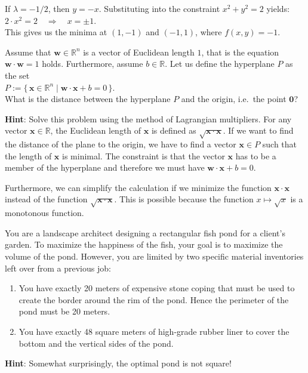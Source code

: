 If $\lambda = -1/2$, then $y = -x$. Substituting into the constraint $x^2 + y^2 = 2$ yields:
\\[0.2cm]
\hspace*{1.3cm}
$2\cdot x^2 = 2 \quad \Rightarrow \quad x = \pm 1$.
\\[0.2cm]
This gives us the minima at $(1,-1)$ and $(-1,1)$, where $f(x,y)=-1$.

\exercise
Assume that $\mathbf{w}\in \mathbb{R}^n$ is a vector of Euclidean length $1$, that is the equation
$\mathbf{w} \cdot \mathbf{w} = 1$ holds.  Furthermore, assume $b \in \mathbb{R}$.  Let us define the hyperplane $P$ as the set
\\[0.2cm]
\hspace*{1.3cm}
$P := \bigl\{\, \mathbf{x} \in \mathbb{R}^n \mid \mathbf{w}\cdot \mathbf{x} + b = 0 \,\bigr\}$.
\\[0.2cm]
What is the distance between the hyperplane $P$ and the origin, i.e.~the point $\mathbf{0}$?
\vspace*{0.1cm}

\noindent
\textbf{Hint}: Solve this problem using the method of Lagrangian multipliers.  For any vector
$\mathbf{x} \in \mathbb{R}$, the Euclidean length of $\mathbf{x}$ is defined as $\sqrt{\mathbf{x} \cdot\mathbf{x}}$.
If we want to find the distance of the plane to the origin, we have to find a vector $\mathbf{x} \in P$
such that the length of $\mathbf{x}$ is minimal.  The constraint is that the vector $\mathbf{x}$
has to be a member of the hyperplane and therefore we must have $\mathbf{w}\cdot\mathbf{x} + b = 0$.

Furthermore, we can simplify the calculation if we minimize the function $\mathbf{x} \cdot\mathbf{x}$
instead of the function $\sqrt{\mathbf{x} \cdot\mathbf{x}}$.  This is possible because the function
$x \mapsto \sqrt{x}$ is a monotonous function.
\eox

\exercise
You are a landscape architect designing a rectangular fish pond for a client's garden.  To maximize the
happiness of the fish, your goal is to maximize the volume of the pond.  However, you are limited by two
specific material inventories left over from a previous job:
\begin{enumerate}
\item You have exactly 20 meters of expensive stone coping that must be used to create the border around the
      rim of the pond.  Hence the perimeter of the pond must be 20 meters.
\item You have exactly 48 square meters of high-grade rubber liner to cover the bottom and the vertical sides
      of the pond. \eox
\end{enumerate}
\textbf{Hint}: Somewhat surprisingly, the optimal pond is not square!


